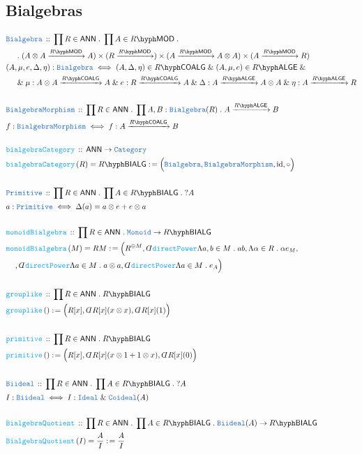 \documentclass[12pt]{scrartcl}%
\newcommand{\TYPE}[1]{\textcolor{NavyBlue}{\mathtt{#1}}}%
\newcommand{\FUNC}[1]{\textcolor{Cerulean}{\mathtt{#1}}}%
\renewcommand{\.}{\; . \;} %
\newcommand{\de}{: \kern 0.1pc =} %
\newcommand{\Act}[1]{\left( #1 \right)} %
\newcommand{\DeclareType}[2]{& \TYPE{#1} \, :: \, #2 \\}%
\newcommand{\DefineType}[3]{& #1 : \TYPE{#2} \iff #3 \\}%
\newcommand{\DeclareFunc}[2]{& \FUNC{#1} \, :: \, #2 \\}%
\newcommand{\DefineFunc}[3]{&  \FUNC{#1}\Act{#2} \de #3 \\}%
\newcommand{\DefineNamedFunc}[4]{&  \FUNC{#1}\Act{#2} = #3 \de #4 \\}%
\newcommand{\NewLine}{\\ & \kern 1pc}%
\newcommand{\Page}[1]{ \begin{align*} #1 \end{align*}  }%
\newcommand{ \bd }{ \ByDef }%
\renewcommand{\And}{\; \& \;}%
\DeclareMathOperator*{\id}{id}%
\newcommand{\Cat}{\TYPE{Category}}%
\newcommand{\ByDef}{\rotatebox[origin=c]{-180}{$D$}}%
\newcommand{\Arrow}[1]{\xrightarrow{#1}}%
\newcommand{\LMOD}[1]{#1\hyph\mathsf{MOD}} %
\newcommand{\ANN}{\mathsf{ANN}} %
\newcommand{\LALGE}[1]{#1\hyph\mathsf{ALGE}}%
\newcommand{\COALG}[1]{#1\hyph\mathsf{COALG}}%
\newcommand{\BIALG}[1]{#1\hyph\mathsf{BIALG}}%
\begin{document}
\subsection{Bialgebras}
\Page{
	\DeclareType{Bialgebra}{\prod R \in \ANN \. \prod A \in \LMOD{R} \.  
		\NewLine \.
		 (A \otimes A \Arrow{\LMOD{R}} A) \times 
		 (R \Arrow{\LMOD{R}}) \times 
		 (A \Arrow{\LMOD{R}} A \otimes A) \times 
		 (A \Arrow{\LMOD{R}} R)
	}
	\DefineType{(A,\mu, e,\Delta,\eta)}{Bialgebra}{
		(A,\Delta,\eta) \in \COALG{R} \And
		(A,\mu,e) \in \LALGE{R} \And \NewLine \And
		\mu : A \otimes A \Arrow{\COALG{R}} A \And
		e  : R \Arrow{\COALG{R}} A \And
		\Delta : A \Arrow{\LALGE{R}} A \otimes A \And
		\eta : A \Arrow{\LALGE{R}} R
	}
	\\
	\DeclareType{BialgebraMorphism}
	{
		\prod R \in \ANN \. 
		\prod A,B : \TYPE{Bialgebra}(R) \.
		A \Arrow{\LALGE{R}} B
	}
	\DefineType{f}{BialgebraMorphism}
	{f : A \Arrow{\COALG{R}} B}
	\\
	\DeclareFunc{bialgebraCategory}{ \ANN \to \Cat }
	\DefineNamedFunc{bialgebraCategory}{R}{\BIALG{R}}
	{\Big(\TYPE{Bialgebra}, \TYPE{BialgebraMorphism}, \id, \circ \Big) }
	\\
	\DeclareType{Primitive}{\prod R \in \ANN \. \prod A \in \BIALG{R} \.?A }
	\DefineType{a}{Primitive}{\Delta(a) = a \otimes e + e \otimes a}
	\\
	\DeclareFunc{monoidBialgebra}{\prod R \in \ANN \. \TYPE{Monoid} \to \BIALG{R}}
	\DefineNamedFunc{monoidBialgebra}{M}{RM}{ 
			\Big( 
				R^{\oplus M}, 
				\bd \FUNC{directPower}\Lambda a,b \in M \. ab,
				\Lambda \alpha \in R \. \alpha e_M , \NewLine,  
				\bd \FUNC{directPower} \Lambda a \in M \. a \otimes a,  
				\bd \FUNC{directPower} \Lambda a \in M \. e_A
			\Big)
		}
	\\
	\DeclareFunc{grouplike}{\prod R \in \ANN \. \BIALG{R}}
	\DefineFunc{grouplike}{}
	{
		\Big(
			R[x],
			\bd R[x] (x \otimes x),
			\bd R[x] (1)
		\Big)
	}
	\\
	\DeclareFunc{primitive}{\prod R \in \ANN \. \BIALG{R}}
	\DefineFunc{primitive}{}
	{
		\Big(
			R[x],
			\bd R[x] (x \otimes 1 + 1 \otimes x),
			\bd R[x] (0)
		\Big)
	}
	\\
	\DeclareType{Biideal}{
		\prod R \in \ANN \. 
		\prod A \in \BIALG{R} \. 
		?A
	}
	\DefineType{I}{Biideal}{I : \TYPE{Ideal} \And \TYPE{Coideal}(A)}
	\\
	\DeclareFunc{BialgebraQuotient}{
		\prod R \in \ANN \.
		\prod A \in \BIALG{R} \.
		\TYPE{Biideal}(A) \to \BIALG{R}
	} 
	\DefineNamedFunc{BialgebraQuotient}{I}{\frac{A}{I}}{\frac{A}{I}}
}
\end{document}
